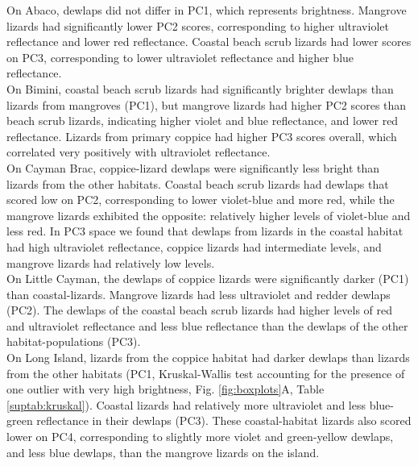 On Abaco, dewlaps did not differ in PC1, which represents brightness. Mangrove lizards had significantly lower PC2 scores, corresponding to higher ultraviolet reflectance and lower red reflectance. Coastal beach scrub lizards had lower scores on PC3, corresponding to lower ultraviolet reflectance and higher blue reflectance.\\

On Bimini, coastal beach scrub lizards had significantly brighter dewlaps than lizards from mangroves (PC1), but mangrove lizards had higher PC2 scores than beach scrub lizards, indicating higher violet and blue reflectance, and lower red reflectance. Lizards from primary coppice had higher PC3 scores overall, which correlated very positively with ultraviolet reflectance.\\

On Cayman Brac, coppice-lizard dewlaps were significantly less bright than lizards from the other habitats. Coastal beach scrub lizards had dewlaps that scored low on PC2, corresponding to lower violet-blue and more red, while the mangrove lizards exhibited the opposite: relatively higher levels of violet-blue and less red. In PC3 space we found that dewlaps from lizards in the coastal habitat had high ultraviolet reflectance, coppice lizards had intermediate levels, and mangrove lizards had relatively low levels.\\

On Little Cayman, the dewlaps of coppice lizards were significantly darker (PC1) than coastal-lizards. Mangrove lizards had less ultraviolet and redder dewlaps (PC2). The dewlaps of the coastal beach scrub lizards had higher levels of red and ultraviolet reflectance and less blue reflectance than the dewlaps of the other habitat-populations (PC3).\\

On Long Island, lizards from the coppice habitat had darker dewlaps than lizards from the other habitats (PC1, Kruskal-Wallis test accounting for the presence of one outlier with very high brightness, Fig. \ref{fig:boxplots}A, Table \ref{suptab:kruskal}). Coastal lizards had relatively more ultraviolet and less blue-green reflectance in their dewlaps (PC3). These coastal-habitat lizards also scored lower on PC4, corresponding to slightly more violet and green-yellow dewlaps, and less blue dewlaps, than the mangrove lizards on the island.\\

